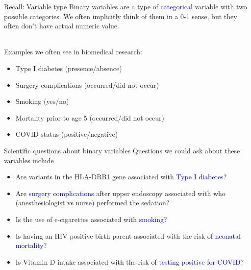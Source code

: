 \documentclass[10pt,t]{beamer}
\begin{document}
\begin{frame}{Recall: Variable type}
Binary variables are a type of \textcolor{blue}{categorical} variable with two possible categories. We often implicitly think of them in a 0-1 sense, but they often don't have actual numeric value. 
\\~\

Examples we often see in biomedical research: 
\medskip

\begin{itemize}
	\item Type I diabetes (presence/absence)
	\medskip
	
	\item Surgery complications (occurred/did not occur)
	\medskip
	
	\item Smoking (yes/no)
	\medskip
	
	\item Mortality prior to age 5 (occurred/did not occur)
	\medskip
	
	\item COVID status (positive/negative)
\end{itemize}
\end{frame}

\begin{frame}{Scientific questions about binary variables}
	Questions we could ask about these variables include
	\medskip
	
	\begin{itemize}
		\item Are variants in the HLA-DRB1 gene associated with \textcolor{blue}{Type I diabetes}? 
		\medskip
		
		\item Are \textcolor{blue}{surgery complications} after upper endoscopy associated with who (anesthesiologist vs nurse) performed the sedation?
		\medskip
		
		\item Is the use of e-cigarettes associated with \textcolor{blue}{smoking}?
		\medskip
		
		\item Is having an HIV positive birth parent associated with the risk of \textcolor{blue}{neonatal mortality}?
		\medskip
		
		\item Is Vitamin D intake associated with the risk of \textcolor{blue}{testing positive for COVID}?
		\medskip
		
	\end{itemize}
\end{frame}
\end{document}
